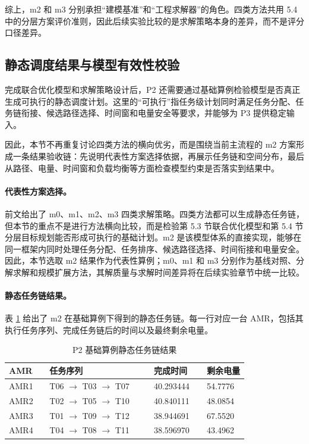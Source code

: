 综上，m2 和 m3 分别承担“建模基准”和“工程求解器”的角色。四类方法共用 5.4 中的分层方案评价准则，因此后续实验比较的是求解策略本身的差异，而不是评分口径差异。

\subsection{静态调度结果与模型有效性校验}

完成联合优化模型和求解策略设计后，P2 还需要通过基础算例检验模型是否真正生成可执行的静态调度计划。这里的“可执行”指任务级计划同时满足任务分配、任务链衔接、候选路径选择、时间窗和电量安全等要求，并能够为 P3 提供稳定输入。

因此，本节不再重复讨论四类方法的横向优劣，而是围绕当前主流程的 m2 方案形成一条结果验收链：先说明代表性方案选择依据，再展示任务链和空间分布，最后从路径、电量、时间窗和负载均衡等方面检查模型约束是否落实到结果中。

\paragraph{代表性方案选择。}
前文给出了 m0、m1、m2、m3 四类求解策略。四类方法都可以生成静态任务链，但本节的重点不是进行方法横向比较，而是检验第 5.3 节联合优化模型和第 5.4 节分层目标规划能否形成可执行的基础计划。m2 是该模型体系的直接实现，能够在同一框架内同时处理任务分配、任务排序、候选路径选择、时间衔接和电量安全。因此，本节选取 m2 结果作为代表性算例；m0、m1 和 m3 分别作为基线对照、分解求解和规模扩展方法，其解质量与求解时间差异将在后续实验章节中统一比较。

\paragraph{静态任务链结果。}
表 \ref{tab:p2-static-sequence} 给出了 m2 在基础算例下得到的静态任务链。每一行对应一台 AMR，包括其执行任务序列、完成任务链后的时间以及最终剩余电量。

\begin{table}[!htbp]
\centering
\small
\begin{tabular}{p{0.14\linewidth}p{0.36\linewidth}p{0.18\linewidth}p{0.12\linewidth}}
\toprule
AMR & 任务序列 & 完成时间 & 剩余电量 \\
\midrule
AMR1 & T06 $\rightarrow$ T03 $\rightarrow$ T07 & 40.293444 & 54.7776 \\
AMR2 & T02 $\rightarrow$ T05 $\rightarrow$ T10 & 40.840111 & 48.0854 \\
AMR3 & T01 $\rightarrow$ T09 $\rightarrow$ T12 & 38.944691 & 67.5520 \\
AMR4 & T04 $\rightarrow$ T08 $\rightarrow$ T11 & 38.596970 & 43.4962 \\
\bottomrule
\end{tabular}
\caption{P2 基础算例静态任务链结果}
\label{tab:p2-static-sequence}
\end{table}

